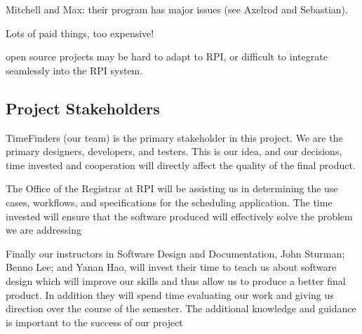\documentclass[11pt]{article}
\begin{document}
Mitchell and Max: their program has major issues (see Axelrod and Sebastian).

Lots of paid things, too expensive!

open source projects may be hard to adapt to RPI, or difficult to integrate seamlessly into the RPI system.



\subsection{Project Stakeholders} %

TimeFinders (our team) is the primary stakeholder in this project.  We are the primary designers, developers, and testers.  This is our idea, and our decisions, time invested and cooperation will directly affect the quality of the final product.

The Office of the Registrar at RPI will be assisting us in determining the use cases, workflows, and specifications for the scheduling application.  The time invested will ensure that the software produced will effectively solve the problem we are addressing

Finally our instructors in Software Design and Documentation, John Sturman; Benno Lee; and Yanan Hao, will invest their time to teach us about software design which will improve our skills and thus allow us to produce a better final product.  In addition they will spend time evaluating our work and giving us direction over the course of the semester.  The additional knowledge and guidance is important to the success of our project


\end{document}

